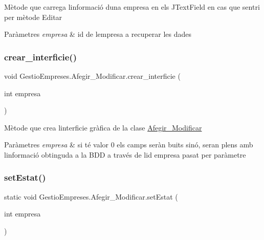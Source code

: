 Mètode que carrega l\textquotesingle{}informació d\textquotesingle{}una empresa en els J\+Text\+Field en cas que s\textquotesingle{}entri per mètode \textquotesingle{}Editar\textquotesingle{} 
\begin{DoxyParams}{Paràmetres}
{\em empresa} & id de l\textquotesingle{}empresa a recuperar les dades \\
\hline
\end{DoxyParams}
\mbox{\label{class_gestio_empreses_1_1_afegir___modificar_ad0541b1f19a81b372bbe41d5f34e3bdb}} 
\subsubsection{\texorpdfstring{crear\_interficie()}{crear\_interficie()}}
{\footnotesize\ttfamily void Gestio\+Empreses.\+Afegir\+\_\+\+Modificar.\+crear\+\_\+interficie (\begin{DoxyParamCaption}\item[{int}]{empresa }\end{DoxyParamCaption})}

Mètode que crea l\textquotesingle{}interficie gràfica de la clase \mbox{\hyperlink{class_gestio_empreses_1_1_afegir___modificar}{Afegir\+\_\+\+Modificar}} 
\begin{DoxyParams}{Paràmetres}
{\em empresa} & si té valor 0 els camps seràn buits sinó, seran plens amb l\textquotesingle{}informació obtinguda a la B\+DD a través de l\textquotesingle{}id empresa pasat per paràmetre \\
\hline
\end{DoxyParams}
\mbox{\label{class_gestio_empreses_1_1_afegir___modificar_a73d48ab3748504cd141dae3ec8a7796d}} 
\subsubsection{\texorpdfstring{setEstat()}{setEstat()}}
{\footnotesize\ttfamily static void Gestio\+Empreses.\+Afegir\+\_\+\+Modificar.\+set\+Estat (\begin{DoxyParamCaption}\item[{int}]{empresa }\end{DoxyParamCaption})\hspace{0.3cm}{\ttfamily [static]}}

